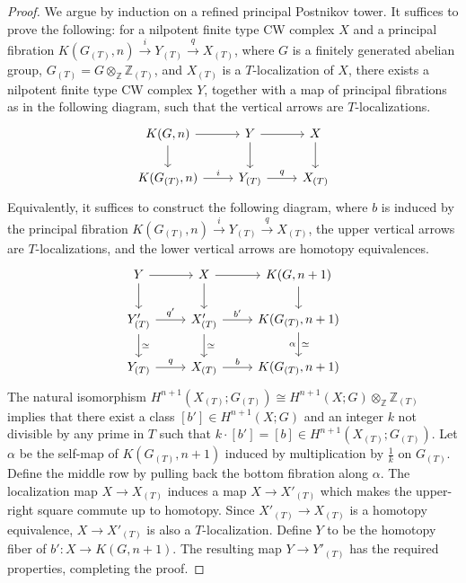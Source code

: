 \documentclass[10pt,a4paper]{amsart}
\newcommand\ZZ{\mathbb{Z}}
\begin{document}
\begin{proof}
We argue by induction on a refined principal Postnikov tower. It suffices to prove the following: for a nilpotent finite type CW complex $X$ and a principal fibration $K(G_{(T)},n)\xrightarrow{i} Y_{(T)}\xrightarrow{q} X_{(T)}$, where $G$ is a finitely generated abelian group, $G_{(T)}=G\otimes_{\ZZ}\ZZ_{(T)}$, and $X_{(T)}$  is a $T$-localization of $X$, there exists a nilpotent finite type CW complex $Y$, together with a map of principal fibrations as in the following diagram, such that the vertical arrows are $T$-localizations.
\[
\begin{tikzcd}
    K(G,n) \arrow[r] \arrow[d] & Y \arrow[r] \arrow[d] & X \arrow[d] \\
    K(G_{(T)},n) \arrow[r,"i"] & Y_{(T)} \arrow[r,"q"] & X_{(T)}
\end{tikzcd}
\]
Equivalently, it suffices to construct the following diagram, where $b$ is induced by the principal fibration $K(G_{(T)},n)\xrightarrow{i} Y_{(T)}\xrightarrow{q} X_{(T)}$, the upper vertical arrows are $T$-localizations, and the lower vertical arrows are homotopy equivalences.
\[
\begin{tikzcd}
    Y \arrow[r] \arrow[d] & X \arrow[r] \arrow[d] & K(G,n+1) \arrow[d] \\
     Y'_{(T)} \arrow[r,"q'"] \arrow[d,"\simeq"] & X'_{(T)} \arrow[r,"b'"] \arrow[d,"\simeq"] & K(G_{(T)},n+1) \arrow[d,"\simeq","\alpha"'] \\
     Y_{(T)} \arrow[r,"q"] & X_{(T)} \arrow[r,"b"]  & K(G_{(T)},n+1) 
\end{tikzcd}
\]
The natural isomorphism $H^{n+1}(X_{(T)};G_{(T)})\cong H^{n+1}(X;G)\otimes_{\ZZ} \ZZ_{(T)}$ implies that there exist a class $[b']\in H^{n+1}(X;G)$ and an integer $k$ not divisible by any prime in $T$ such that $k\cdot [b']=[b]\in H^{n+1}(X_{(T)};G_{(T)})$. Let $\alpha$ be the self-map of $K(G_{(T)},n+1)$ induced by multiplication by $\frac{1}{k}$ on $ G_{(T)}$. Define the middle row by pulling back the bottom fibration along $\alpha$. The localization map $X\rightarrow X_{(T)}$ induces a map $X\rightarrow X'_{(T)}$ which makes the upper-right square commute up to homotopy. Since $X'_{(T)}\rightarrow X_{(T)}$ is a homotopy equivalence, $X\rightarrow X'_{(T)}$ is also a $T$-localization. Define $Y$ to be the homotopy fiber of $b':X\rightarrow K(G,n+1)$. The resulting map $Y\rightarrow Y'_{(T)}$ has the required properties, completing the proof.
\end{proof}
\end{document}
